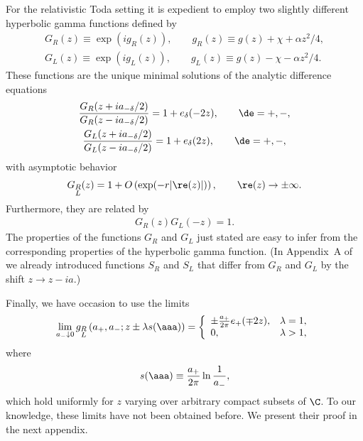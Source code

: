 \documentclass[pdftex]{sigma}
\numberwithin{equation}{section}
\begin{document}
For the relativistic Toda setting it is expedient to employ two slightly dif\/ferent hyperbolic gamma functions def\/ined by
\begin{gather}\label{GRDef}
	G_R(z) \equiv \exp(ig_R(z)),\qquad g_R(z)\equiv g(z)+\chi + \alpha z^2/4,
\\
\label{GLDef}
	G_L(z) \equiv \exp(ig_L(z)),\qquad  g_L(z)\equiv g(z)-\chi - \alpha z^2/4.
\end{gather}
These functions are the unique minimal solutions of the analytic dif\/ference equations
\begin{gather}\label{GRDE}
	\frac{G_R(z+ia_{-\delta}/2)}{G_R(z-ia_{-\delta}/2)} = 1+e_\delta(-2z),\qquad \de=+,-,
\\
\label{GLDE}
	\frac{G_L(z+ia_{-\delta}/2)}{G_L(z-ia_{-\delta}/2)} = 1+e_\delta(2z),\qquad \de=+,-,
\end{gather}
with asymptotic behavior
\begin{gather}\label{GRLas}
	G_{\substack{R \\ L}}(z) = 1 + O\left(\exp(-r |\re(z)|)\right),\qquad \re(z)\to\pm\infty.
	\end{gather}
Furthermore, they are related by
\begin{gather}\label{GRGL}
G_R(z)G_L(-z)=1.
\end{gather}
 The properties of the functions $G_R$ and $G_L$ just stated are easy to infer from the corresponding properties of the hyperbolic gamma function. (In Appendix~A of~\cite{Hels} we already introduced functions $S_R$ and $S_L$ that dif\/fer from $G_R$ and $G_L$ by the shift $z\to z-ia$.)

 Finally, we have occasion to use  the limits
\begin{gather}\label{gLRLimit}
	\lim_{a_-\downarrow 0}g_{\substack{R\\L}}\left(a_{+},a_{-};z\pm \lambda s(\aaa)\right) =
	\left\lbrace \begin{array}{ll}	\pm\frac{a_+}{2\pi}e_+(\mp 2z), & \lambda=1,\\  0 , & \lambda>1,\end{array}\right.
	\end{gather}
where
\begin{gather}\label{defs}
s(\aaa)\equiv \frac{a_+}{2\pi}\ln\frac{1}{a_-},	
\end{gather}
which hold uniformly for $z$ varying over arbitrary compact subsets of $\C$. To our  knowledge, these limits have not been obtained before. We present their proof in the next appendix.
\end{document}
